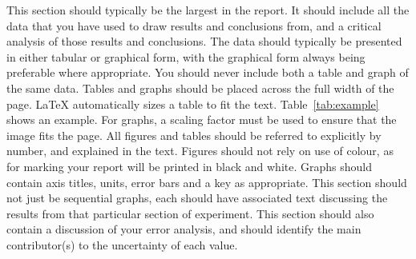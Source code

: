 \documentclass[11pt]{article} %
\begin{document}
This section should typically be the largest in the report. It should include all the data that you have used to draw results and conclusions from, and a critical analysis of those results and conclusions. The data should typically be presented in either tabular or graphical form, with the graphical form always being preferable where appropriate. You should never include both a table and graph of the same data. Tables and graphs should be placed across the full width of the page. LaTeX automatically sizes a table to fit the text.  Table~\ref{tab:example} shows an example. 
For graphs, a scaling factor must be used to ensure that the image fits the page. All figures and tables should be referred to explicitly by number, and explained in the text. Figures should not rely on use of colour, as for marking your report will be printed in black and white. Graphs should contain axis titles, units, error bars and a key as appropriate. This section should not just be sequential graphs, each should have associated text discussing the results from that particular section of experiment. This section should also contain a discussion of your error analysis, and should identify the main contributor(s) to the uncertainty of each value.
\end{document}
